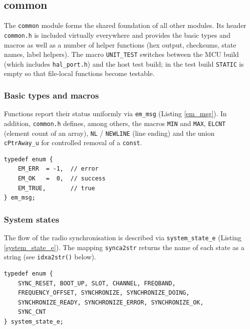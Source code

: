 \subsection{common}\label{common}
The \verb|common| module forms the shared foundation of all other modules. Its
header \verb|common.h| is included virtually everywhere and provides the basic
types and macros as well as a number of helper functions (hex output,
checksums, state names, label helpers). The macro \verb|UNIT_TEST| switches
between the MCU build (which includes \verb|hal_port.h|) and the host test
build; in the test build \verb|STATIC| is empty so that file-local functions
become testable.

\subsubsection*{Basic types and macros}
Functions report their status uniformly via \verb|em_msg|
(Listing \ref{em_msg}). In addition, \verb|common.h| defines, among others,
the macros \verb|MIN| and \verb|MAX|, \verb|ELCNT| (element count of an
array), \verb|NL| / \verb|NEWLINE| (line ending) and the union
\verb|cPtrAway_u| for controlled removal of a \verb|const|.

\begin{listing}
\begin{verbatim}
typedef enum {
    EM_ERR  = -1,  // error
    EM_OK   =  0,  // success
    EM_TRUE,       // true
} em_msg;
\end{verbatim}
\caption{Uniform return type \texttt{em\_msg}}
\label{em_msg}
\end{listing}

\subsubsection*{System states}
The flow of the radio synchronisation is described via \verb|system_state_e|
(Listing \ref{system_state_e}). The mapping \verb|synca2str| returns the name
of each state as a string (see \verb|idxa2str()| below).

\begin{listing}
\begin{verbatim}
typedef enum {
    SYNC_RESET, BOOT_UP, SLOT, CHANNEL, FREQBAND,
    FREQUENCY_OFFSET, SYNCHRONIZE, SYNCHRONIZE_DOING,
    SYNCHRONIZE_READY, SYNCHRONIZE_ERROR, SYNCHRONIZE_OK,
    SYNC_CNT
} system_state_e;
\end{verbatim}
\caption{Synchronisation states \texttt{system\_state\_e}}
\label{system_state_e}
\end{listing}

